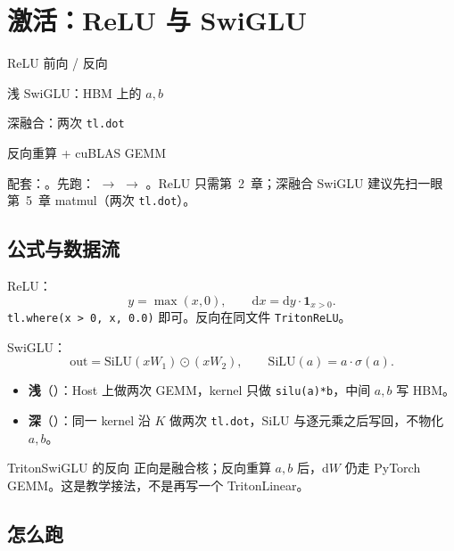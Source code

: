 \chapter{激活：ReLU 与 SwiGLU}

\begin{introduction}
  \item ReLU 前向 / 反向
  \item 浅 SwiGLU：HBM 上的 $a,b$
  \item 深融合：两次 \texttt{tl.dot}
  \item 反向重算 + cuBLAS GEMM
\end{introduction}

配套：。先跑： $\to$  $\to$ 。ReLU 只需第~2~章；深融合 SwiGLU 建议先扫一眼第~5~章 matmul（两次 \texttt{tl.dot}）。

\section{公式与数据流}

ReLU：
\[
y=\max(x,0),\qquad \mathrm{d}x=\mathrm{d}y\cdot\mathbf{1}_{x>0}.
\]
\texttt{tl.where(x > 0, x, 0.0)} 即可。反向在同文件 \texttt{TritonReLU}。

SwiGLU：
\[
\mathrm{out}=\mathrm{SiLU}(xW_1)\odot(xW_2),\qquad \mathrm{SiLU}(a)=a\cdot\sigma(a).
\]

\begin{itemize}
  \item \textbf{浅}（）：Host 上做两次 GEMM，kernel 只做 \texttt{silu(a)*b}，中间 $a,b$ 写 HBM。
  \item \textbf{深}（）：同一 kernel 沿 $K$ 做两次 \texttt{tl.dot}，SiLU 与逐元乘之后写回，不物化 $a,b$。
\end{itemize}

\figswiglu


\begin{proposition}{TritonSwiGLU 的反向}
正向是融合核；反向重算 $a,b$ 后，$\mathrm{d}W$ 仍走 PyTorch GEMM。这是教学接法，不是再写一个 TritonLinear。
\end{proposition}

\section{怎么跑}

